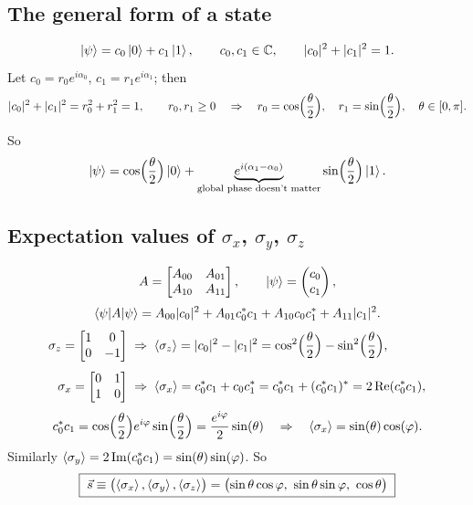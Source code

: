 \documentclass[12pt]{article}
\theoremstyle{plain}
\theoremstyle{remark}
\newcommand{\C}{\mathbb{C}}
\newcommand{\vecb}[1]{\vec{#1}}
\DeclareMathOperator{\Real}{Re}
\DeclareMathOperator{\Imag}{Im}
\begin{document}
\subsection{The general form of a state}

\[
  \ket{\psi} = c_0\ket{0} + c_1\ket{1}, \qquad c_0, c_1 \in \C, \qquad |c_0|^2 + |c_1|^2 = 1 .
\]
Let $c_0 = r_0 e^{i\alpha_0}$, $c_1 = r_1 e^{i\alpha_1}$; then
\[
  |c_0|^2 + |c_1|^2 = r_0^2 + r_1^2 = 1, \qquad r_0, r_1 \geq 0
  \quad\Rightarrow\quad
  r_0 = \cos\Bigl(\frac{\theta}{2}\Bigr), \quad r_1 = \sin\Bigl(\frac{\theta}{2}\Bigr), \quad \theta \in [0, \pi] .
\]
\begin{center}
\end{center}
So
\[
  \ket{\psi} = \cos\Bigl(\frac{\theta}{2}\Bigr)\ket{0} + \underbrace{e^{i(\alpha_1 - \alpha_0)}}_{\text{global phase doesn't matter}}\sin\Bigl(\frac{\theta}{2}\Bigr)\ket{1} .
\]

\subsection{Expectation values of $\sigma_x$, $\sigma_y$, $\sigma_z$}

\[
  A = \begin{bmatrix} A_{00} & A_{01} \\ A_{10} & A_{11} \end{bmatrix}, \qquad
  \ket{\psi} = \begin{pmatrix} c_0 \\ c_1 \end{pmatrix} ,
\]
\[
  \braket{\psi|A|\psi} = A_{00}|c_0|^2 + A_{01}c_0^* c_1 + A_{10}c_0 c_1^* + A_{11}|c_1|^2 .
\]
\begin{align*}
  \sigma_z = \begin{bmatrix} 1 & 0 \\ 0 & -1 \end{bmatrix}
  &\;\Rightarrow\; \braket{\sigma_z} = |c_0|^2 - |c_1|^2 = \cos^2\Bigl(\frac{\theta}{2}\Bigr) - \sin^2\Bigl(\frac{\theta}{2}\Bigr) , \\[4pt]
  \sigma_x = \begin{bmatrix} 0 & 1 \\ 1 & 0 \end{bmatrix}
  &\;\Rightarrow\; \braket{\sigma_x} = c_0^* c_1 + c_0 c_1^* = c_0^* c_1 + (c_0^* c_1)^* = 2\Real(c_0^* c_1) ,
\end{align*}
\[
  c_0^* c_1 = \cos\Bigl(\frac{\theta}{2}\Bigr) e^{i\varphi}\sin\Bigl(\frac{\theta}{2}\Bigr)
            = \frac{e^{i\varphi}}{2}\sin(\theta)
  \quad\Rightarrow\quad \braket{\sigma_x} = \sin(\theta)\cos(\varphi) .
\]
Similarly $\braket{\sigma_y} = 2\Imag(c_0^* c_1) = \sin(\theta)\sin(\varphi)$. So
\[
  \boxed{\; \vecb{s} \equiv \bigl(\braket{\sigma_x}, \braket{\sigma_y}, \braket{\sigma_z}\bigr)
        = \bigl(\sin\theta\cos\varphi,\ \sin\theta\sin\varphi,\ \cos\theta\bigr) \;}
\]
\end{document}
